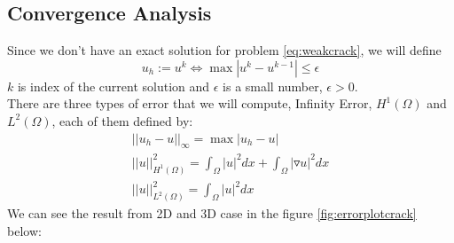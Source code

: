 \documentclass[a4paper,11pt]{article}
\begin{document}
\subsection{Convergence Analysis}
Since we don't have an exact solution for problem \eqref{eq:weakcrack}, we will define $$u_h:= u^k \iff \max|u^k-u^{k-1}| \leq \epsilon$$ $k$ is index of the current solution and $\epsilon$ is a small number, $\epsilon > 0$.\\
There are three types of error that we will compute, Infinity Error, $H^1(\Omega)$ and $L^2(\Omega)$, each of them defined by:
\begin{eqnarray}
||u_h - u||_\infty = \max|u_h-u|\\
||u||^2_{H^1(\Omega)} = \int_\Omega |u|^2 dx + \int_\Omega |\triangledown u|^2 dx\\
||u||^2_{L^2(\Omega)} = \int_\Omega |u|^2 dx
\end{eqnarray}
We can see the result from 2D and 3D case in the figure \ref{fig:errorplotcrack} below:
\end{document}

